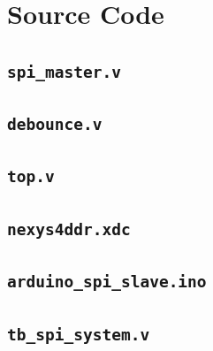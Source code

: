 \documentclass[12pt,a4paper]{report}
\begin{document}
\section{Source Code}

\subsection{\texttt{spi\_master.v}}



\subsection{\texttt{debounce.v}}



\subsection{\texttt{top.v}}



\subsection{\texttt{nexys4ddr.xdc}}



\subsection{\texttt{arduino\_spi\_slave.ino}}



\subsection{\texttt{tb\_spi\_system.v}}


\end{document}
